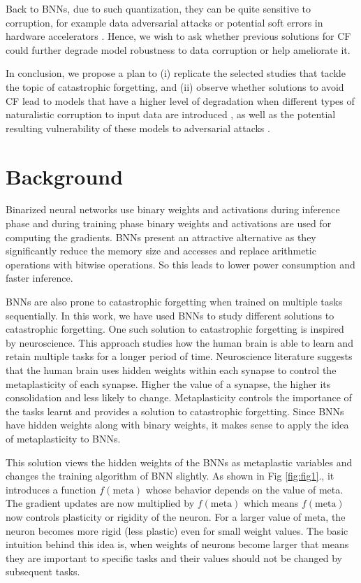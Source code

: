 \documentclass[manuscript,screen,review]{acmart}
\begin{document}
Back to BNNs, due to such quantization, they can be quite sensitive to corruption, for example data adversarial attacks \cite{Lin_2019} or potential soft errors in hardware accelerators \cite{Khoshavi2020}. Hence, we wish to ask whether previous solutions for CF \cite{Laborieux_Ernoult_Hirtzlin_Querlioz_2021} could further degrade model robustness to data corruption or help ameliorate it.

In conclusion, we propose a plan to (i) replicate the selected studies that tackle the topic of catastrophic forgetting, and (ii) observe whether solutions to avoid CF lead to models that have a higher level of degradation when different types of naturalistic corruption to input data are introduced \cite{Hendrycks_2018}, as well as the potential resulting vulnerability of these models to adversarial attacks \cite{Lin_2019}.

\section{Background}
Binarized neural networks use binary weights and activations during inference phase and during training phase binary weights and activations are used for computing the gradients. BNNs present an attractive alternative as they significantly reduce the memory size and accesses and replace arithmetic operations with bitwise operations. So this leads to lower power consumption and faster inference. 

BNNs are also prone to catastrophic forgetting when trained on multiple tasks sequentially. In this work, we have used BNNs to study different solutions to catastrophic forgetting. One such solution to catastrophic forgetting is inspired by neuroscience. This approach studies how the human brain is able to learn and retain multiple tasks for a longer period of time. Neuroscience literature suggests that the human brain uses hidden weights within each synapse to control the metaplasticity of each synapse. Higher the value of a synapse, the higher its consolidation and less likely to change. Metaplasticity controls the importance of the tasks learnt and provides a solution to catastrophic forgetting. Since BNNs have hidden weights along with binary weights, it makes sense to apply the idea of metaplasticity to BNNs. 

This solution views the hidden weights of the BNNs as metaplastic variables and changes the training algorithm of BNN slightly. As shown in Fig \ref{fig:fig1}., it introduces a function \(f(\text{meta})\) whose behavior depends on the value of meta. The gradient updates are now multiplied by \(f(\text{meta})\) which means \(f(\text{meta})\) now controls plasticity or rigidity of the neuron. For a larger value of meta, the neuron becomes more rigid (less plastic) even for small weight values. The basic intuition behind this idea is, when weights of neurons become larger that means they are important to specific tasks and their values should not be changed by subsequent tasks. 
\end{document}
